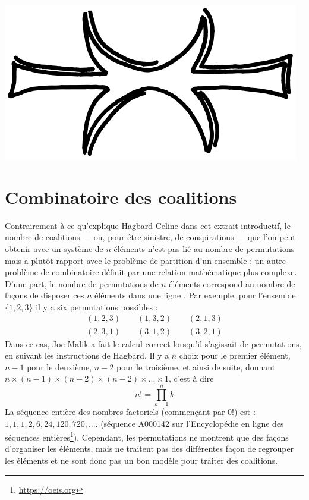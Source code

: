 \begin{center}
\includegraphics[scale=0.1]{./img/eris.png}
\end{center}

\section*{Combinatoire des coalitions}
Contrairement à ce qu'explique Hagbard Celine dans cet extrait introductif, le nombre de coalitions --- ou, pour être sinistre, de conspirations --- que l'on peut obtenir avec un système de $n$ éléments n'est pas lié au nombre de permutations mais a plutôt rapport avec le problème de partition d'un ensemble ; un autre problème de combinatoire définit par une relation mathématique plus complexe.\\

D'une part, le nombre de permutations de $n$ éléments correspond au nombre de façons de disposer ces $n$ éléments dans une ligne \cite{Graham1988}. Par exemple, pour l'ensemble $\{1,2,3\}$ il y a six permutations possibles :
\begin{gather*}
(1,2,3) \qquad (1,3,2) \qquad (2,1,3) \\ 
(2,3,1) \qquad (3,1,2) \qquad (3,2,1)
\end{gather*}
Dans ce cas, Joe Malik a fait le calcul correct lorsqu'il s'agissait de permutations, en suivant les instructions de Hagbard. Il y a $n$ choix pour le premier élément, $n-1$ pour le deuxième, $n-2$ pour le troisième, et ainsi de suite, donnant $n\times(n-1)\times(n-2)\times(n-2)\times...\times1$, c'est à dire
\begin{equation}
n ! = \prod\limits_{k = 1}^n k
\end{equation}
La séquence entière des nombres factoriels (commençant par $0!$) est : $1, 1, 1, 2, 6, 24, 120, 720, ....$ (séquence A000142 sur l'Encyclopédie en ligne des séquences entières\footnote{\url{https://oeis.org}}).
Cependant, les permutations ne montrent que des façons d'organiser les éléments, mais ne traitent pas des différentes façon de regrouper les éléments et ne sont donc pas un bon modèle pour traiter des coalitions.\\

